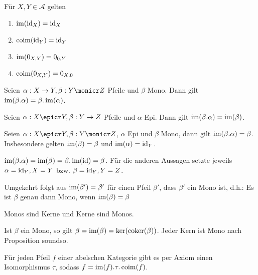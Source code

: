 \begin{prop}
Für $X,Y \in \mathcal A$ gelten
\begin{enumerate}
\item $\operatorname{im}(\operatorname{id}_X) = \operatorname{id}_X$
\item $\operatorname{coim}(\operatorname{id}_Y) = \operatorname{id}_Y$
\item $\operatorname{im}(0_{X,Y}) = 0_{0,Y}$
\item $\operatorname{coim}(0_{X,Y}) = 0_{X,0}$
\end{enumerate}
\end{prop}


\begin{prop}
Seien $\alpha : X \to Y, \beta : Y \monicr Z$ Pfeile und $\beta$ Mono.
Dann gilt $\operatorname{im}(\beta.\alpha) = \beta.\operatorname{im}(\alpha)$.
\end{prop}


\begin{prop}
Seien $\alpha : X \epicr Y, \beta : Y \to Z$ Pfeile und $\alpha$ Epi.
Dann gilt $\operatorname{im}(\beta.\alpha) = \operatorname{im}(\beta)$.
\end{prop}

\begin{korr}
Seien $\alpha : X \epicr Y, \beta : Y \monicr Z$, $\alpha$ Epi und $\beta$ Mono, dann gilt $\operatorname{im}(\beta.\alpha) = \beta$. Insbesondere gelten $\operatorname{im}(\beta) = \beta$ und $\operatorname{im}(\alpha) = \operatorname{id}_Y$.
\end{korr}
\begin{bew}
$\operatorname{im}(\beta.\alpha) = \operatorname{im}(\beta) = \beta.\operatorname{im}(\operatorname{id}) = \beta$. Für die anderen Aussagen setzte jeweils $\alpha = \operatorname{id}_Y, X=Y$ bzw. $\beta = \operatorname{id}_Y, Y=Z$.
\end{bew}
\begin{bem}
Umgekehrt folgt aus $\operatorname{im}(\beta') = \beta'$ für einen Pfeil $\beta'$, dass $\beta'$ ein Mono ist, d.h.:
Es ist $\beta$ genau dann Mono, wenn $\operatorname{im}(\beta) = \beta$
\end{bem}

\begin{korr}
Monos sind Kerne und Kerne sind Monos.
\end{korr}
\begin{bew}
Ist $\beta$ ein Mono, so gilt $\beta = \operatorname{im}(\beta) = \ker(\operatorname{coker}(\beta))$.
Jeder Kern ist Mono nach Proposition soundso.
\end{bew}

\begin{bem}
Für jeden Pfeil $f$ einer abelschen Kategorie gibt es per Axiom einen Isomorphismus $\tau$, sodass $f = \operatorname{im}(f).\tau.\operatorname{coim}(f)$.
\end{bem}

